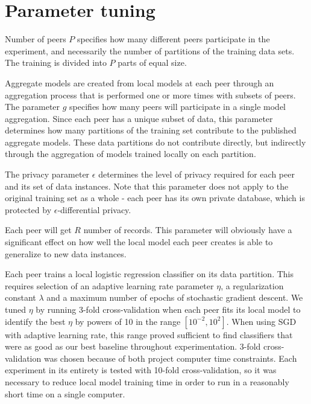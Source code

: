 \section{Parameter tuning}
\label{sec:parameter_tuning}
Number of peers $P$ specifies how many different peers participate in the experiment, and necessarily the number of partitions of the training data sets. The training is divided into $P$ parts of equal size.


Aggregate models are created from local models at each peer through an aggregation process that is performed one or more times with subsets of peers. The parameter $g$ specifies how many peers will participate in a single model aggregation. Since each peer has a unique subset of data, this parameter determines how many partitions of the training set contribute to the published aggregate models. These data partitions do not contribute directly, but indirectly through the aggregation of models trained locally on each partition.

The privacy parameter $\epsilon$ determines the level of privacy required for each peer and its set of data instances. Note that this parameter does not apply to the original training set as a whole - each peer has its own private database, which is protected by $\epsilon$-differential privacy. 

Each peer will get $R$ number of records. This parameter will obviously have a significant effect on how well the local model each peer creates is able to generalize to new data instances. 

Each peer trains a local logistic regression classifier on its data partition. This requires selection of an adaptive learning rate parameter $\eta$, a regularization constant $\lambda$ and a maximum number of epochs of stochastic gradient descent. We tuned $\eta$ by running 3-fold cross-validation when each peer fits its local model to identify the best $\eta$ by powers of 10 in the range $[10^{-2}, 10^{2}]$. When using SGD with adaptive learning rate, this range proved sufficient to find classifiers that were as good as our best baseline throughout experimentation. 3-fold cross-validation was chosen because of both project computer time constraints. Each experiment in its entirety is tested with 10-fold cross-validation, so it was necessary to reduce local model training time in order to run in a reasonably short time on a single computer.

